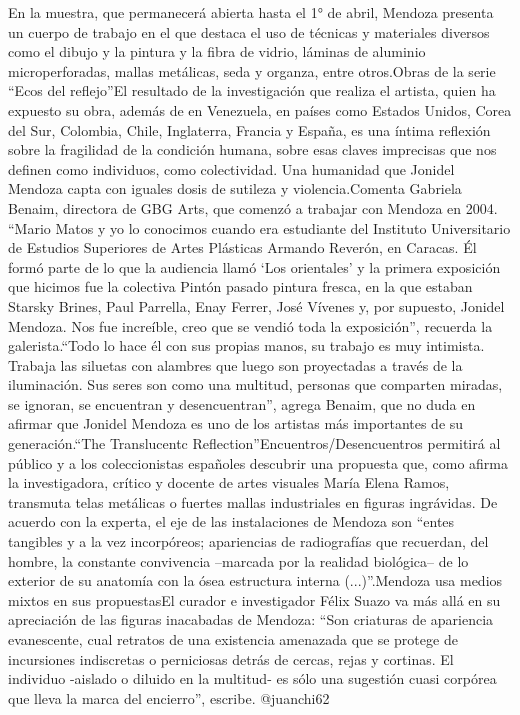 \documentclass{article}%
\begin{document}
En la muestra, que permanecerá abierta hasta el 1° de abril, Mendoza presenta un cuerpo de trabajo en el que destaca el uso de técnicas y materiales diversos como el dibujo y la pintura y la fibra de vidrio, láminas de aluminio microperforadas, mallas metálicas, seda y organza, entre otros.Obras de la serie “Ecos del reflejo”El resultado de la investigación que realiza el artista, quien ha expuesto su obra, además de en Venezuela, en países como Estados Unidos, Corea del Sur, Colombia, Chile, Inglaterra, Francia y España, es una íntima reflexión sobre la fragilidad de la condición humana, sobre esas claves imprecisas que nos definen como individuos, como colectividad. Una humanidad que Jonidel Mendoza capta con iguales dosis de sutileza y violencia.Comenta Gabriela Benaim, directora de GBG Arts, que comenzó a trabajar con Mendoza en 2004. “Mario Matos y yo lo conocimos cuando era estudiante del Instituto Universitario de Estudios Superiores de Artes Plásticas Armando Reverón, en Caracas. Él formó parte de lo que la audiencia llamó ‘Los orientales’ y la primera exposición que hicimos fue la colectiva Pintón pasado pintura fresca, en la que estaban Starsky Brines, Paul Parrella, Enay Ferrer, José Vívenes y, por supuesto, Jonidel Mendoza. Nos fue increíble, creo que se vendió toda la exposición”, recuerda la galerista.“Todo lo hace él con sus propias manos, su trabajo es muy intimista. Trabaja las siluetas con alambres que luego son proyectadas a través de la iluminación. Sus seres son como una multitud, personas que comparten miradas, se ignoran, se encuentran y desencuentran”, agrega Benaim, que no duda en afirmar que Jonidel Mendoza es uno de los artistas más importantes de su generación.“The Translucentc Reflection”Encuentros/Desencuentros permitirá al público y a los coleccionistas españoles descubrir una propuesta que, como afirma la investigadora, crítico y docente de artes visuales María Elena Ramos, transmuta telas metálicas o fuertes mallas industriales en figuras ingrávidas. De acuerdo con la experta, el eje de las instalaciones de Mendoza son “entes tangibles y a la vez incorpóreos; apariencias de radiografías que recuerdan, del hombre, la constante convivencia –marcada por la realidad biológica– de lo exterior de su anatomía con la ósea estructura interna (...)”.Mendoza usa medios mixtos en sus propuestasEl curador e investigador Félix Suazo va más allá en su apreciación de las figuras inacabadas de Mendoza: “Son criaturas de apariencia evanescente, cual retratos de una existencia amenazada que se protege de incursiones indiscretas o perniciosas detrás de cercas, rejas y cortinas.  El  individuo {-}aislado o diluido en la multitud{-} es sólo una sugestión cuasi corpórea que lleva la marca del encierro”, escribe.%
\newline%
%
@juanchi62%
\newline%
%
\end{document}
